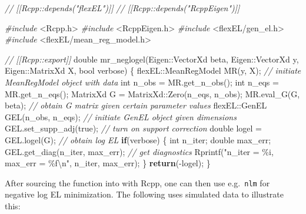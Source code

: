 \documentclass[article]{jss}
\newenvironment{Shaded}{\begin{snugshade}}{\end{snugshade}}
\newcommand{\CommentTok}[1]{\textcolor[rgb]{0.56,0.35,0.01}{\textit{#1}}}
\newcommand{\ControlFlowTok}[1]{\textcolor[rgb]{0.13,0.29,0.53}{\textbf{#1}}}
\newcommand{\DataTypeTok}[1]{\textcolor[rgb]{0.13,0.29,0.53}{#1}}
\newcommand{\ImportTok}[1]{#1}
\newcommand{\NormalTok}[1]{#1}
\newcommand{\PreprocessorTok}[1]{\textcolor[rgb]{0.56,0.35,0.01}{\textit{#1}}}
\newcommand{\SpecialCharTok}[1]{\textcolor[rgb]{0.00,0.00,0.00}{#1}}
\newcommand{\StringTok}[1]{\textcolor[rgb]{0.31,0.60,0.02}{#1}}
\renewcommand{\|}{\,|\,}
\begin{document}
\begin{Shaded}
\begin{Highlighting}[]
\CommentTok{// [[Rcpp::depends("flexEL")]]}
\CommentTok{// [[Rcpp::depends("RcppEigen")]]}

\PreprocessorTok{\#include }\ImportTok{\textless{}Rcpp.h\textgreater{}}
\PreprocessorTok{\#include }\ImportTok{\textless{}RcppEigen.h\textgreater{}}
\PreprocessorTok{\#include }\ImportTok{\textless{}flexEL/gen\_el.h\textgreater{}}
\PreprocessorTok{\#include }\ImportTok{\textless{}flexEL/mean\_reg\_model.h\textgreater{}}

\CommentTok{// [[Rcpp::export]]}
\DataTypeTok{double}\NormalTok{ mr\_neglogel(Eigen::VectorXd beta,}
\NormalTok{                   Eigen::VectorXd y,}
\NormalTok{                   Eigen::MatrixXd X,}
                   \DataTypeTok{bool}\NormalTok{ verbose) \{}
\NormalTok{  flexEL::MeanRegModel MR(y, X); }\CommentTok{// initiate MeanRegModel object with data}
  \DataTypeTok{int}\NormalTok{ n\_obs = MR.get\_n\_obs();}
  \DataTypeTok{int}\NormalTok{ n\_eqs = MR.get\_n\_eqs();}
\NormalTok{  MatrixXd G = MatrixXd::Zero(n\_eqs, n\_obs);}
\NormalTok{  MR.eval\_G(G, beta); }\CommentTok{// obtain G matrix given certain parameter values}
\NormalTok{  flexEL::GenEL GEL(n\_obs, n\_eqs); }\CommentTok{// initiate GenEL object given dimensions}
\NormalTok{  GEL.set\_supp\_adj(true); }\CommentTok{// turn on support correction}
  \DataTypeTok{double}\NormalTok{ logel = GEL.logel(G); }\CommentTok{// obtain log EL}
  \ControlFlowTok{if}\NormalTok{(verbose) \{}
    \DataTypeTok{int}\NormalTok{ n\_iter;}
    \DataTypeTok{double}\NormalTok{ max\_err;}
\NormalTok{    GEL.get\_diag(n\_iter, max\_err); }\CommentTok{// get diagnostics}
\NormalTok{    Rprintf(}\StringTok{"n\_iter = \%i, max\_err = \%f}\SpecialCharTok{\textbackslash{}n}\StringTok{"}\NormalTok{, n\_iter, max\_err);}
\NormalTok{  \}}
  \ControlFlowTok{return}\NormalTok{({-}logel);}
\NormalTok{\}}
\end{Highlighting}
\end{Shaded}

After sourcing the function into  with Rcpp, one can then use e.g.~\texttt{nlm} for negative log EL minimization. The following uses simulated data to illustrate this:
\end{document}
